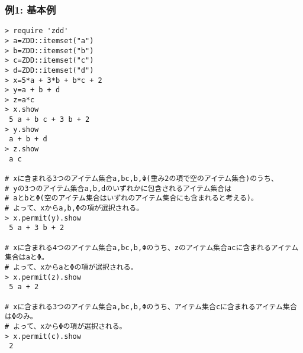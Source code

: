 \subsubsection*{例1: 基本例}



\begin{Verbatim}[baselinestretch=0.7,frame=single]
> require 'zdd'
> a=ZDD::itemset("a")
> b=ZDD::itemset("b")
> c=ZDD::itemset("c")
> d=ZDD::itemset("d")
> x=5*a + 3*b + b*c + 2
> y=a + b + d
> z=a*c
> x.show
 5 a + b c + 3 b + 2
> y.show
 a + b + d
> z.show
 a c

# xに含まれる3つのアイテム集合a,bc,b,Φ(重み2の項で空のアイテム集合)のうち、
# yの3つのアイテム集合a,b,dのいずれかに包含されるアイテム集合は
# aとbとΦ(空のアイテム集合はいずれのアイテム集合にも含まれると考える)。
# よって、xからa,b,Φの項が選択される。
> x.permit(y).show
 5 a + 3 b + 2

# xに含まれる4つのアイテム集合a,bc,b,Φのうち、zのアイテム集合acに含まれるアイテム集合はaとΦ。
# よって、xからaとΦの項が選択される。
> x.permit(z).show
 5 a + 2

# xに含まれる3つのアイテム集合a,bc,b,Φのうち、アイテム集合cに含まれるアイテム集合はΦのみ。
# よって、xからΦの項が選択される。
> x.permit(c).show
 2
\end{Verbatim}
